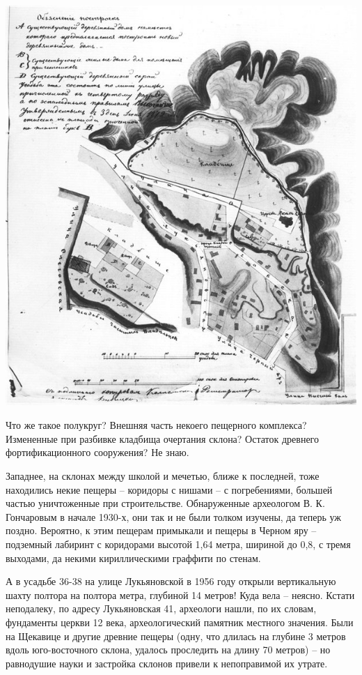 \begin{center}
\includegraphics[width=\linewidth]{chast-colebanie-osnov/sheka/1872-shekavica.jpg}
\end{center}

Что же такое полукруг? Внешняя часть некоего пещерного комплекса? Измененные при разбивке кладбища очертания склона? Остаток древнего фортификационного сооружения? Не знаю.

Западнее, на склонах между школой и мечетью, ближе к последней, тоже находились некие пещеры – коридоры с нишами – с погребениями, большей частью уничтоженные при строительстве. Обнаруженные археологом В. К. Гончаровым в начале 1930-х, они так и не были толком изучены, да теперь уж поздно. Вероятно, к этим пещерам примыкали и пещеры в Черном яру – подземный лабиринт с коридорами высотой 1,64 метра, шириной до 0,8, с тремя выходами, да некими кириллическими граффити по стенам. 

А в усадьбе 36-38 на улице Лукьяновской в 1956 году открыли вертикальную шахту полтора на полтора метра, глубиной 14 метров! Куда вела – неясно. Кстати неподалеку, по адресу Лукьяновская 41, археологи нашли, по их словам, фундаменты церкви 12 века, археологический памятник местного значения. Были на Щекавице и другие древние пещеры (одну,  что длилась на глубине 3 метров вдоль юго-восточного склона, удалось проследить на длину 70 метров) – но равнодушие науки и застройка склонов привели к непоправимой их утрате.

